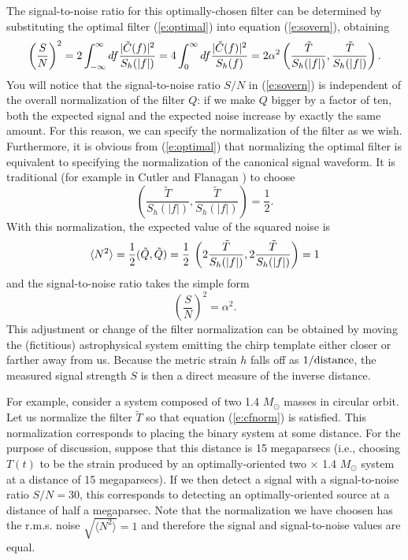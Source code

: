 The signal-to-noise ratio for this optimally-chosen filter can be
determined by substituting the optimal filter (\ref{e:optimal}) into
equation (\ref{e:sovern}), obtaining
\begin{equation}
\nonumber
\left( {S \over N} \right)^2 = 
 2 \int_{-\infty}^\infty df {| \tilde C(f) |^2 \over S_h(|f|)} =
 4 \int_{0}^\infty df { | \tilde C(f) |^2 \over S_h(f)} = 2 \alpha^2 
 \left(\frac{\tilde{T}}{S_h(|f|)},\frac{\tilde{T}}{S_h(|f|)}\right).
\end{equation}
You will notice that the signal-to-noise ratio $S/N$ in
(\ref{e:sovern}) is independent of the overall normalization of the
filter $Q$:  if we make $Q$ bigger by a factor of ten, both the
expected signal and the expected noise increase by exactly the same
amount.  For this reason, we can specify the normalization of the 
filter as we wish. Furthermore, it is obvious from (\ref{e:optimal}) 
that normalizing the optimal filter is equivalent to specifying the
normalization of the canonical signal waveform. It is traditional
(for example in Cutler and Flanagan \cite{cutler:1994})
to choose 
\begin{equation}
\label{e:cfnorm}
   \left(\frac{\tilde{T}}{S_h(|f|)},\frac{\tilde{T}}{S_h(|f|)}
   \right)=\frac{1}{2}.
\end{equation}
With this normalization, 
the expected value of the squared noise is
\begin{equation}
\langle N^2 \rangle = {1 \over 2} (\tilde Q,\tilde Q) = {1 \over 2} \>
\left( 2 \frac{\tilde{T}}{S_h(|f|)},2 \frac{\tilde{T}}{S_h(|f|)}
   \right) = 1
\end{equation}
and the signal-to-noise ratio takes the simple form
\begin{equation}
\left(\frac{S}{N}\right)^2 = \alpha^2.
\end{equation}
This adjustment or change of the filter normalization can be obtained 
by moving the (fictitious) astrophysical system emitting the chirp 
template either closer or farther away from us.  Because the metric 
strain $h$ falls off as $1/\rm distance$, the measured signal strength 
$S$ is then a direct measure of the inverse distance.

For example, consider a system composed of two  1.4 $M_\odot$ masses in
circular orbit.  Let us normalize the filter $\tilde T$ so that equation
(\ref{e:cfnorm}) is satisfied.  This normalization corresponds to placing
the binary system at some distance.  For the purpose of discussion,
suppose that this distance is 15 megaparsecs (i.e., choosing $T(t)$
to be the strain produced by an optimally-oriented two $\times$ 1.4
$M_\odot$ system at a distance of 15 megaparsecs).  If we then detect
a signal with a signal-to-noise ratio $S/N=30$, this corresponds to
detecting an optimally-oriented source at a distance of half a megaparsec.
Note that the normalization we have choosen has the r.m.s. noise $\sqrt{
\langle N^2 \rangle}= 1$ and therefore the signal and signal-to-noise
values are equal.

